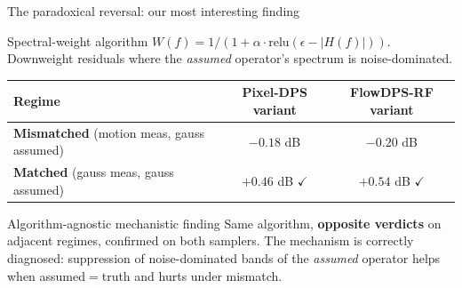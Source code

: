 \documentclass[10pt,aspectratio=169]{beamer}
\begin{document}
\begin{frame}{The paradoxical reversal: our most interesting finding}
  \begin{block}{Spectral-weight algorithm}
    $W(f) = 1 / (1 + \alpha \cdot \mathrm{relu}(\epsilon - |H(f)|))$.
    Downweight residuals where the \emph{assumed} operator's spectrum
    is noise-dominated.
  \end{block}

  \begin{table}
    \centering
    \begin{tabular}{lcc}
      \toprule
      Regime & Pixel-DPS variant & FlowDPS-RF variant \\
      \midrule
      \textbf{Mismatched} (motion meas, gauss assumed)
        & \textcolor{bad}{$-0.18$ dB} & \textcolor{bad}{$-0.20$ dB} \\
      \textbf{Matched} (gauss meas, gauss assumed)
        & \textcolor{good}{$+0.46$ dB $\checkmark$} & \textcolor{good}{$+0.54$ dB $\checkmark$} \\
      \bottomrule
    \end{tabular}
  \end{table}

  \vspace{0.3em}
  \begin{alertblock}{Algorithm-agnostic mechanistic finding}
    Same algorithm, \textbf{opposite verdicts} on adjacent regimes,
    confirmed on both samplers. The mechanism is correctly diagnosed:
    suppression of noise-dominated bands of the \emph{assumed} operator
    helps when assumed${=}$truth and hurts under mismatch.
  \end{alertblock}

\end{frame}
\end{document}
